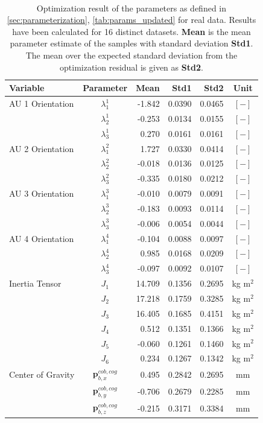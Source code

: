 ~\\

\begin{table}[H]
\captionsetup{width=0.9\textwidth}
\centering
\begin{tabular}{lcrrrc}
Variable & Parameter & Mean & Std1 & Std2 & Unit \\
\hline \hline
AU 1 Orientation & $\lambda_1^1$ & -1.842 & 0.0390 & 0.0465 & $[-]$ \\
                 & $\lambda_2^1$ & -0.253 & 0.0134 & 0.0155 & $[-]$ \\
                 & $\lambda_3^1$ &  0.270 & 0.0161 & 0.0161 & $[-]$ \\
AU 2 Orientation & $\lambda_1^2$ &  1.727 & 0.0330 & 0.0414 & $[-]$ \\
                 & $\lambda_2^2$ & -0.018 & 0.0136 & 0.0125 & $[-]$ \\
                 & $\lambda_3^2$ & -0.335 & 0.0180 & 0.0212 & $[-]$ \\
AU 3 Orientation & $\lambda_1^3$ & -0.010 & 0.0079 & 0.0091 & $[-]$ \\
                 & $\lambda_2^3$ & -0.183 & 0.0093 & 0.0114 & $[-]$ \\
                 & $\lambda_3^3$ & -0.006 & 0.0054 & 0.0044 & $[-]$ \\
AU 4 Orientation & $\lambda_1^4$ & -0.104 & 0.0088 & 0.0097 & $[-]$ \\
                 & $\lambda_2^4$ &  0.985 & 0.0168 & 0.0209 & $[-]$ \\
                 & $\lambda_3^4$ & -0.097 & 0.0092 & 0.0107 & $[-]$ \\
\hline
Inertia Tensor & $J_1$ & 14.709 & 0.1356 & 0.2695 & kg m$^2$ \\
               & $J_2$ & 17.218 & 0.1759 & 0.3285 & kg m$^2$ \\
               & $J_3$ & 16.405 & 0.1685 & 0.4151 & kg m$^2$ \\
               & $J_4$ &  0.512 & 0.1351 & 0.1366 & kg m$^2$ \\
               & $J_5$ & -0.060 & 0.1261 & 0.1460 & kg m$^2$ \\
               & $J_6$ &  0.234 & 0.1267 & 0.1342 & kg m$^2$ \\
\hline
Center of Gravity & $\mathbf{p}_{b,x}^{cob,cog}$ &  0.495 & 0.2842 & 0.2695 & mm \\
                  & $\mathbf{p}_{b,y}^{cob,cog}$ & -0.706 & 0.2679 & 0.2285 & mm \\
                  & $\mathbf{p}_{b,z}^{cob,cog}$ & -0.215 & 0.3171 & 0.3384 & mm \\
\hline
\end{tabular}
\caption{Optimization result of the parameters as defined in \cref{sec:parameterization}, \cref{tab:params_updated} for real data. Results have been calculated for 16 distinct datasets. \textbf{Mean} is the mean parameter estimate of the samples with standard deviation \textbf{Std1}. The mean over the expected standard deviation from the optimization residual is given as \textbf{Std2}. }
\end{table}
